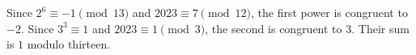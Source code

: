 Since $ 2^6\equiv-1\pmod{13}$ and $ 2023\equiv7\pmod{12}$, the first power is congruent to $-2 $. Since $ 3^3\equiv1 $ and $ 2023\equiv1\pmod3 $, the second is congruent to $ 3 $. Their sum is $\boxed1 $ modulo thirteen.
